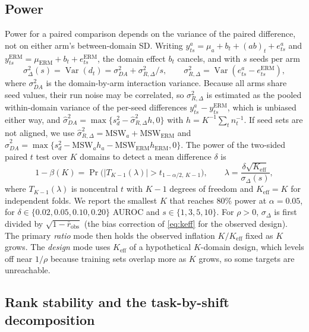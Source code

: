 \subsection{Power}
\label{sec:protocol-power}

Power for a paired comparison depends on the variance of the paired
difference, not on either arm's between-domain SD. Writing
$y^{a}_{ts}=\mu_a+b_t+(ab)_{t}+e^{a}_{ts}$ and
$y^{\text{ERM}}_{ts}=\mu_{\text{ERM}}+b_t+e^{\text{ERM}}_{ts}$, the domain
effect $b_t$ cancels, and with $s$ seeds per arm
\begin{equation}
  \sigma_\Delta^2(s)=\operatorname{Var}(d_t)=\sigma_{DA}^2+\sigma_{R,\Delta}^2/s,
  \qquad \sigma_{R,\Delta}^2=\operatorname{Var}(e^{a}_{ts}-e^{\text{ERM}}_{ts}),
  \label{eq:diffvar}
\end{equation}
where $\sigma_{DA}^2$ is the domain-by-arm interaction variance. Because all
arms share seed values, their run noise may be correlated, so
$\sigma^2_{R,\Delta}$ is estimated as the pooled within-domain variance of the
per-seed differences $y^{a}_{ts}-y^{\text{ERM}}_{ts}$, which is unbiased either
way, and $\hat\sigma_{DA}^2=\max\{s_d^2-\hat\sigma^2_{R,\Delta}h,0\}$ with
$h=K^{-1}\sum_t n_t^{-1}$. If seed sets are not aligned, we use
$\hat\sigma^2_{R,\Delta}=\mathrm{MSW}_a+\mathrm{MSW}_{\text{ERM}}$ and
$\hat\sigma_{DA}^2=\max\{s_d^2-\mathrm{MSW}_a h_a-\mathrm{MSW}_{\text{ERM}}h_{\text{ERM}},0\}$.
The power of the two-sided paired $t$ test over $K$ domains to detect a mean
difference $\delta$ is
\begin{equation}
  1-\beta(K)=\Pr\big(|T_{K-1}(\lambda)|>t_{1-\alpha/2,\,K-1}\big),\qquad
  \lambda=\frac{\delta\sqrt{K_{\text{eff}}}}{\sigma_\Delta(s)},
  \label{eq:power}
\end{equation}
where $T_{K-1}(\lambda)$ is noncentral $t$ with $K-1$ degrees of freedom and
$K_{\text{eff}}=K$ for independent folds. We report the smallest $K$ that
reaches 80\% power at $\alpha=0.05$, for
$\delta\in\{0.02,0.05,0.10,0.20\}$ AUROC and $s\in\{1,3,5,10\}$. For
$\rho>0$, $\sigma_\Delta$ is first divided by $\sqrt{1-\bar r_{\text{obs}}}$
(the bias correction of \eqref{eq:keff} for the observed design). The primary
\emph{ratio} mode then holds the observed inflation $K/K_{\text{eff}}$ fixed as
$K$ grows. The \emph{design} mode uses $K_{\text{eff}}$ of a hypothetical
$K$-domain design, which levels off near $1/\rho$ because training sets overlap
more as $K$ grows, so some targets are unreachable.

\subsection{Rank stability and the task-by-shift decomposition}
\label{sec:protocol-ranks}

